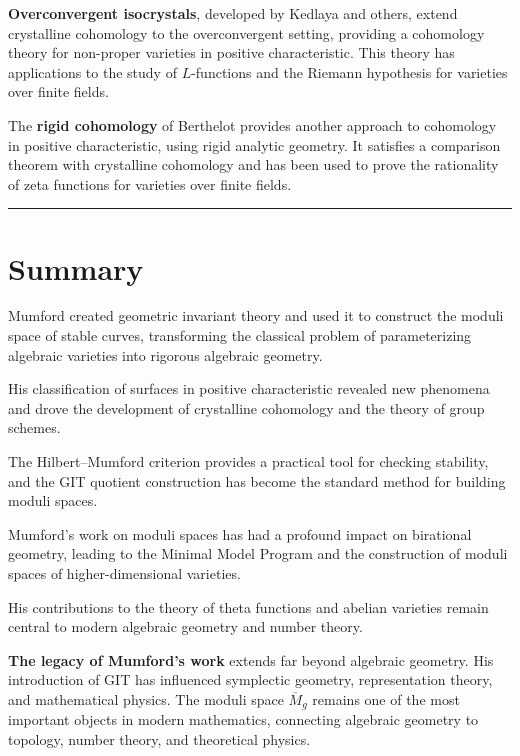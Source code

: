 \textbf{Overconvergent isocrystals}, developed by Kedlaya and others, extend crystalline cohomology to the overconvergent setting, providing a cohomology theory for non-proper varieties in positive characteristic. This theory has applications to the study of $L$-functions and the Riemann hypothesis for varieties over finite fields.

The \textbf{rigid cohomology} of Berthelot provides another approach to cohomology in positive characteristic, using rigid analytic geometry. It satisfies a comparison theorem with crystalline cohomology and has been used to prove the rationality of zeta functions for varieties over finite fields.

\begin{center}\rule{0.5\linewidth}{0.5pt}\end{center}

\section*{Summary}

Mumford created geometric invariant theory and used it to construct the moduli space of stable curves, transforming the classical problem of parameterizing algebraic varieties into rigorous algebraic geometry.

His classification of surfaces in positive characteristic revealed new phenomena and drove the development of crystalline cohomology and the theory of group schemes.

The Hilbert--Mumford criterion provides a practical tool for checking stability, and the GIT quotient construction has become the standard method for building moduli spaces.

Mumford's work on moduli spaces has had a profound impact on birational geometry, leading to the Minimal Model Program and the construction of moduli spaces of higher-dimensional varieties.

His contributions to the theory of theta functions and abelian varieties remain central to modern algebraic geometry and number theory.

\textbf{The legacy of Mumford's work} extends far beyond algebraic geometry. His introduction of GIT has influenced symplectic geometry, representation theory, and mathematical physics. The moduli space $\overline{M}_g$ remains one of the most important objects in modern mathematics, connecting algebraic geometry to topology, number theory, and theoretical physics.

